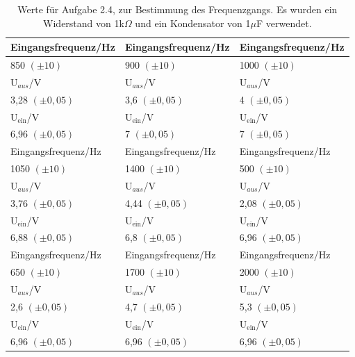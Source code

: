 \documentclass[12pt]{scrartcl}
\begin{document}
\begin{table}[H]
\caption{Werte für Aufgabe 2.4, zur Bestimmung des Frequenzgangs. Es wurden ein Widerstand von 1k$\Omega$ und ein Kondensator von 1$\mu$F verwendet.}
\begin{center}
\begin{tabular}{|l|l|l|}
\hline
Eingangsfrequenz/Hz & Eingangsfrequenz/Hz & Eingangsfrequenz/Hz \\ \hline
850 $(\pm 10)$ & 900 $(\pm 10)$ & 1000 $(\pm 10)$ \\ \hline
U$_{aus}$/V & U$_{aus}$/V & U$_{aus}$/V \\ \hline
3,28 $(\pm 0,05)$ & 3,6 $(\pm 0,05)$ & 4 $(\pm 0,05)$ \\ \hline
U$_\text{ein}$/V & U$_\text{ein}$/V & U$_\text{ein}$/V \\ \hline
6,96 $(\pm 0,05)$ & 7 $(\pm 0,05)$ & 7 $(\pm 0,05)$ \\ \hline \hline
Eingangsfrequenz/Hz & Eingangsfrequenz/Hz & Eingangsfrequenz/Hz \\ \hline
1050 $(\pm 10)$ & 1400 $(\pm 10)$ & 500 $(\pm 10)$ \\ \hline
U$_{aus}$/V & U$_{aus}$/V & U$_{aus}$/V \\ \hline
3,76 $(\pm 0,05)$ & 4,44 $(\pm 0,05)$ & 2,08 $(\pm 0,05)$ \\ \hline
U$_\text{ein}$/V & U$_\text{ein}$/V & U$_\text{ein}$/V \\ \hline
6,88 $(\pm 0,05)$ & 6,8 $(\pm 0,05)$ & 6,96 $(\pm 0,05)$ \\ \hline \hline
Eingangsfrequenz/Hz & Eingangsfrequenz/Hz & Eingangsfrequenz/Hz \\ \hline
650 $(\pm 10)$ & 1700 $(\pm 10)$ & 2000 $(\pm 10)$ \\ \hline
U$_{aus}$/V & U$_{aus}$/V & U$_{aus}$/V \\ \hline
2,6 $(\pm 0,05)$ & 4,7 $(\pm 0,05)$ & 5,3 $(\pm 0,05)$ \\ \hline
U$_\text{ein}$/V & U$_\text{ein}$/V & U$_\text{ein}$/V \\ \hline
6,96 $(\pm 0,05)$ & 6,96 $(\pm 0,05)$ & 6,96 $(\pm 0,05)$ \\ \hline
\end{tabular}
\end{center}
\label{tab:2.4}
\end{table}
\end{document}
